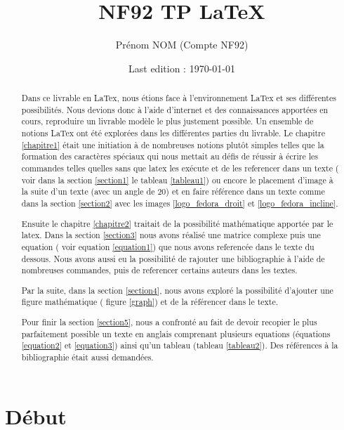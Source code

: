 \documentclass[a4paper, french, 8pt]{report}
\title{NF92 TP \LaTeX}
\author{Prénom NOM (Compte NF92)}
\date{Last edition : \today}
\begin{document}
\maketitle
\listoffigures
\listoftables

\begin{abstract}

\indent Dans ce livrable en LaTex, nous étions face à l'environnement LaTex et ses différentes possibilités. Nous devions donc à l'aide d'internet et des connaissances apportées en cours, reproduire un livrable modèle le plus justement possible. Un ensemble de notions LaTex ont été explorées dans les différentes parties du livrable. Le chapitre \ref{chapitre1} était une initiation à de nombreuses notions plutôt simples telles que la formation des caractères spéciaux qui nous mettait au défis de réussir à écrire les commandes telles quelles sans que latex les exécute et de les referencer dans un texte ( voir dans la section \ref{section1} le tableau \ref{tableau1}) ou encore le placement d'image à la suite d'un texte (avec un angle de 20\degre) et en faire référence dans un texte comme dans la section \ref{section2} avec les images \ref{logo_fedora_droit} et \ref{logo_fedora_incline}.

\medskip
\indent Ensuite le chapitre \ref{chapitre2} traitait de la possibilité mathématique apportée par le latex. Dans la section \ref{section3} nous avons réalisé une matrice complexe puis une equation ( voir equation \ref{equation1}) que nous avons referencée dans le texte du dessous. Nous avons aussi eu la possibilité de rajouter une bibliographie à l'aide de nombreuses commandes, puis de referencer certains auteurs dans les textes.

\medskip
\indent Par la suite, dans la section \ref{section4}, nous avons exploré la possibilité d'ajouter une figure mathématique ( figure \ref{graph}) et de la référencer dans le texte. 

\medskip
\indent Pour finir la section \ref{section5}, nous a confronté au fait de devoir recopier le plus parfaitement possible un texte en anglais comprenant plusieurs equations (équations \ref{equation2} et \ref{equation3}) ainsi qu'un tableau (tableau \ref{tableau2}). Des références à la bibliographie était aussi demandées.   
\end{abstract}

\chapter{Début}
\label{chapitre1}
\end{document}
